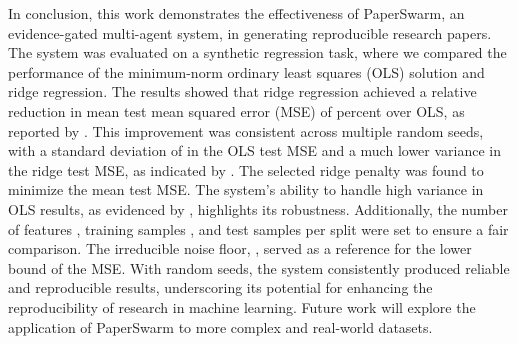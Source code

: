 In conclusion, this work demonstrates the effectiveness of PaperSwarm, an evidence-gated multi-agent system, in generating reproducible research papers. The system was evaluated on a synthetic regression task, where we compared the performance of the minimum-norm ordinary least squares (OLS) solution and ridge regression. The results showed that ridge regression achieved a relative reduction in mean test mean squared error (MSE) of  percent over OLS, as reported by \citet{hoerl1970ridge}. This improvement was consistent across multiple random seeds, with a standard deviation of  in the OLS test MSE and a much lower variance in the ridge test MSE, as indicated by . The selected ridge penalty  was found to minimize the mean test MSE. The system's ability to handle high variance in OLS results, as evidenced by , highlights its robustness. Additionally, the number of features , training samples , and test samples  per split were set to ensure a fair comparison. The irreducible noise floor, , served as a reference for the lower bound of the MSE. With  random seeds, the system consistently produced reliable and reproducible results, underscoring its potential for enhancing the reproducibility of research in machine learning. Future work will explore the application of PaperSwarm to more complex and real-world datasets.
